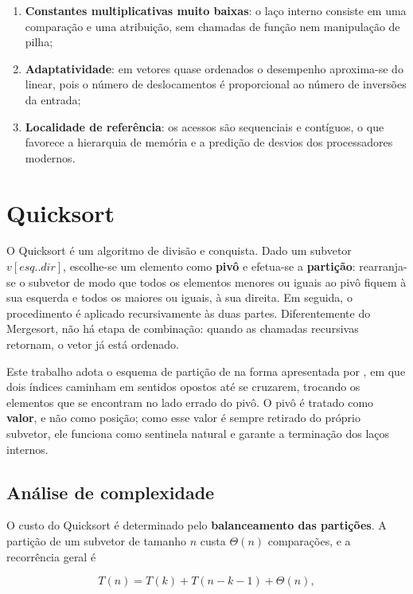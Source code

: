 \begin{enumerate}
  \item \textbf{Constantes multiplicativas muito baixas}: o laço interno consiste em
        uma comparação e uma atribuição, sem chamadas de função nem manipulação de
        pilha;
  \item \textbf{Adaptatividade}: em vetores quase ordenados o desempenho aproxima-se
        do linear, pois o número de deslocamentos é proporcional ao número de
        inversões da entrada;
  \item \textbf{Localidade de referência}: os acessos são sequenciais e
        contíguos, o que favorece a hierarquia de memória e a predição de desvios
        dos processadores modernos.
\end{enumerate}

\section{Quicksort}
\label{sec:quicksort}

O Quicksort \cite{hoare1961,hoare1962} é um algoritmo de divisão e conquista. Dado
um subvetor $v[esq..dir]$, escolhe-se um elemento como \textbf{pivô} e efetua-se a
\textbf{partição}: rearranja-se o subvetor de modo que todos os elementos menores ou
iguais ao pivô fiquem à sua esquerda e todos os maiores ou iguais, à sua direita.
Em seguida, o procedimento é aplicado recursivamente às duas partes. Diferentemente
do Mergesort, não há etapa de combinação: quando as chamadas recursivas retornam, o
vetor já está ordenado.

Este trabalho adota o esquema de partição de  na forma
apresentada por , em que dois índices caminham em sentidos
opostos até se cruzarem, trocando os elementos que se encontram no lado errado do
pivô. O pivô é tratado como \textbf{valor}, e não como posição; como esse valor é
sempre retirado do próprio subvetor, ele funciona como sentinela natural e garante a
terminação dos laços internos.

\subsection{Análise de complexidade}

O custo do Quicksort é determinado pelo \textbf{balanceamento das partições}. A
partição de um subvetor de tamanho $n$ custa $\Theta(n)$ comparações, e a recorrência
geral é

\begin{equation}
T(n) = T(k) + T(n - k - 1) + \Theta(n),
\end{equation}

